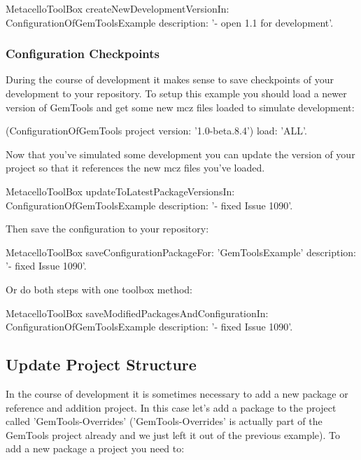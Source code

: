 \documentclass[a4paper,10pt,twoside]{book}
\begin{document}
\begin{code}{}
\begin{code}{}
\begin{code}{}
MetacelloToolBox
  createNewDevelopmentVersionIn: ConfigurationOfGemToolsExample
  description: '- open 1.1 for development'.
\end{code}

\subsubsection{Configuration Checkpoints}

During the course of development it makes sense to save checkpoints of your development to your repository. To setup this example you should load a newer version of GemTools and get some new mcz files loaded to simulate development:

\begin{code}{}
(ConfigurationOfGemTools project version: '1.0-beta.8.4')
  load: 'ALL'.
\end{code}  

Now that you've simulated some development you can update the  version of your project so that it references the new mcz files you've loaded.

\begin{code}{}
MetacelloToolBox
  updateToLatestPackageVersionsIn: ConfigurationOfGemToolsExample
  description: '- fixed Issue 1090'.
 \end{code} 
 
Then save the configuration to your repository:

\begin{code}{}
MetacelloToolBox
  saveConfigurationPackageFor: 'GemToolsExample'
  description: '- fixed Issue 1090'.
 \end{code}
    
Or do both steps with one toolbox method:

\begin{code}{}
MetacelloToolBox
  saveModifiedPackagesAndConfigurationIn: ConfigurationOfGemToolsExample
  description: '- fixed Issue 1090'.
\end{code}
  
\subsection{Update Project Structure}

In the course of development it is sometimes necessary to add a new package or reference and addition project. In this case let's add a package to the project called 'GemTools-Overrides' ('GemTools-Overrides' is actually part of the GemTools project already and we just left it out of the previous example). To add a new package a project you need to:


\end{code}
\end{code}
\end{document}

